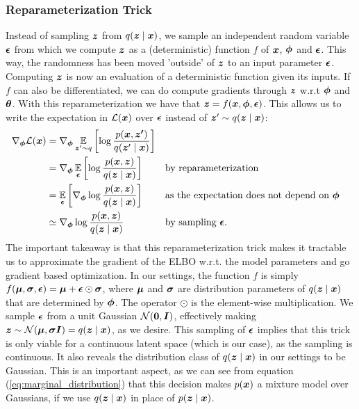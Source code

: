 \subsubsection{Reparameterization Trick}
Instead of sampling $\bm{ z }$ from $q(\bm{ z } \mid \bm{ x })$, we sample an independent random variable $\bm{ \epsilon }$ from which we compute $\bm{ z }$ as a (deterministic) function $f$ of $\bm{ x }$, $\bm{ \phi }$ and $\bm{ \epsilon }$. This way, the randomness has been moved 'outside' of $\bm{ z }$ to an input parameter $\bm{ \epsilon }$. Computing $\bm{ z }$ is now an evaluation of a deterministic function given its inputs. If $f$ can also be differentiated, we can do compute gradients through $\bm{ z }$ w.r.t $\bm{ \phi }$ and $\bm{ \theta }$. With this reparameterization we have that $\bm{ z } = f(\bm{ x }, \bm{ \phi }, \bm{ \epsilon })$. This allows us to write the expectation in $\mathcal{L}(\bm{ x })$ over $\bm{ \epsilon }$ instead of $\bm{ z }' \sim q(\bm{ z } \mid \bm{ x })$:
\begin{align*}
\nabla_{\bm{ \phi }}\mathcal{L}(\bm{ x }) &= \nabla_{\bm{ \phi }} \operatorname*{\mathbb{E}}_{\bm{ z }'\sim q}{\mathopen{} \left[ \log \frac{p(\bm{ x }, \bm{ z' })}{q(\bm{ z }' \mid \bm{ x })} \right] \mathclose{}}\\
&= \nabla_{\bm{ \phi }} \operatorname*{\mathbb{E}}_{\bm{ \epsilon }}{\mathopen{} \left[ \log \frac{p(\bm{ x }, \bm{ z })}{q(\bm{ z } \mid \bm{ x })} \right] \mathclose{}} &&\text{by reparameterization}\\
&= \operatorname*{\mathbb{E}}_{\bm{ \epsilon }}{\mathopen{} \left[ \nabla_{\bm{ \phi }} \log \frac{p(\bm{ x }, \bm{ z })}{q(\bm{ z } \mid \bm{ x })} \right] \mathclose{}} &&\text{as the expectation does not depend on $\bm{ \phi }$}\\
&\simeq \nabla_{\bm{ \phi }} \log \frac{p(\bm{ x }, \bm{ z })}{q(\bm{ z } \mid \bm{ x })} &&\text{by sampling $\bm{ \epsilon }$.}
\end{align*}
The important takeaway is that this reparameterization trick makes it tractable us to approximate the gradient of the ELBO w.r.t. the model parameters and go gradient based optimization. In our settings, the function $f$ is simply $f(\bm{ \mu }, \bm{ \sigma }, \bm{ \epsilon }) = \bm{ \mu } + \bm{ \epsilon } \odot \bm{ \sigma }$, where $\bm{ \mu }$ and $\bm{ \sigma }$ are distribution parameters of $q(\bm{ z } \mid \bm{ x })$ that are determined by $\bm{ \phi }$. The operator $\odot$ is the element-wise multiplication. We sample $\bm{ \epsilon }$ from a unit Gaussian $\mathcal{N}{\mathopen{} \left( \bm{ 0 }, \bm{ I } \right) \mathclose{}}$, effectively making $\bm{ z } \sim \mathcal{N}{\mathopen{} \left( \bm{ \mu }, \bm{ \sigma I } \right) \mathclose{}} = q(\bm{ z } \mid \bm{ x })$, as we desire. This sampling of $\bm{ \epsilon }$ implies that this trick is only viable for a continuous latent space (which is our case), as the sampling is continuous. It also reveals the distribution class of $q(\bm{ z } \mid \bm{ x })$ in our settings to be Gaussian. This is an important aspect, as we can see from equation (\ref{eq:marginal_distribution}) that this decision makes $p(\bm{ x })$ a mixture model over Gaussians, if we use $q(\bm{ z } \mid \bm{ x })$ in place of $p(\bm{ z } \mid \bm{ x })$.


